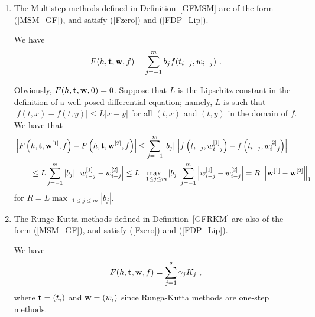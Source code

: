 \begin{enumerate}
\item The Multistep methods defined in Definition~\ref{GFMSM} are of the
form (\ref{MSM_GF}), and satisfy (\ref{Fzero}) and (\ref{FDP_Lip}).

We have
\[
F(h,\mathbf{t},\mathbf{w},f) = \sum_{j=-1}^m b_j f(t_{i-j},w_{i-j}) \ .
\]

Obviously, $F(h,\mathbf{t},\mathbf{w},0) = 0$.  Suppose that $L$ is the
Lipschitz constant in the definition of a well posed differential
equation; namely, $L$ is such that
$|f(t,x)-f(t,y)| \leq L |x-y|$ for all $(t,x)$ and $(t,y)$ in
the domain of $f$.  We have that
\begin{align*}
&\left| F\left(h,\mathbf{t},\mathbf{w}^{[1]},f\right)
- F\left(h,\mathbf{t},\mathbf{w}^{[2]},f\right) \right|
\leq \sum_{j=-1}^m |b_j|\,
\left| f\left(t_{i-j},w_{i-j}^{[1]}\right)
- f\left(t_{i-j},w_{i-j}^{[2]}\right) \right| \\
& \qquad
\leq L \sum_{j=-1}^m |b_j|\, \left| w_{i-j}^{[1]} - w_{i-j}^{[2]} \right|
\leq L \max_{-1 \leq j \leq m} |b_j| 
\sum_{j=-1}^m \left| w_{i-j}^{[1]} - w_{i-j}^{[2]} \right|
= R \, \left\|\mathbf{w}^{[1]}-\mathbf{w}^{[2]} \right\|_1
\end{align*}
for $\displaystyle R = L \max_{-1 \leq j \leq m} |b_j|$.
\item The Runge-Kutta methods defined in Definition~\ref{GFRKM} are also
of the form (\ref{MSM_GF}), and satisfy (\ref{Fzero}) and (\ref{FDP_Lip}).

We have
\[
  F(h,\mathbf{t},\mathbf{w},f) = \sum_{j=1}^s \gamma_j K_j \ ,
\]
where $\mathbf{t} = (t_i)$ and $\mathbf{w} = (w_i)$ since Runga-Kutta methods
are one-step methods.


\end{enumerate}
